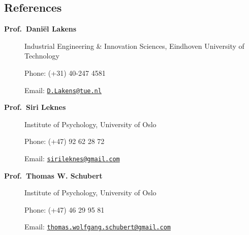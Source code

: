 \documentclass[]{article}
\begin{document}
\subsection{References}\label{references}

\begin{description}
\item[\textbf{Prof.~Daniël Lakens}]
Industrial Engineering \& Innovation Sciences, Eindhoven University of
Technology

Phone: (+31) 40-247 4581

Email: \href{mailto:D.Lakens@tue.nl}{\nolinkurl{D.Lakens@tue.nl}}
\item[\textbf{Prof.~Siri Leknes}]
Institute of Psychology, University of Oslo

Phone: (+47) 92 62 28 72

Email:
\href{mailto:sirileknes@gmail.com}{\nolinkurl{sirileknes@gmail.com}}
\item[\textbf{Prof.~Thomas W. Schubert}]
Institute of Psychology, University of Oslo

Phone: (+47) 46 29 95 81

Email:
\href{mailto:thomas.wolfgang.schubert@gmail.com}{\nolinkurl{thomas.wolfgang.schubert@gmail.com}}
\end{description}
\end{document}

